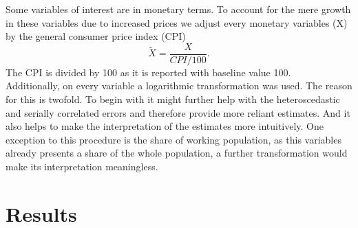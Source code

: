 \documentclass[
]{article}
\begin{document}
	Some variables of interest are in monetary terms. To account for the mere growth in these variables due to increased prices we adjust every monetary variables (X) by the general consumer price index (CPI)
	$$\widetilde{X} = \frac{X}{CPI/100}.$$
	The CPI is divided by 100 as it is reported with baseline value 100.\\
	Additionally, on every variable a logarithmic transformation was used. The reason for this is twofold. To begin with it might further help with the heteroscedastic and serially correlated errors and therefore provide more reliant estimates. And it also helps to make the interpretation of the estimates more intuitively. One exception to this procedure is the share of working population, as this variables already presents a share of the whole population, a further transformation would make its interpretation meaningless.\\
	
	
	
	\section{Results} \label{Results}
	
\end{document}
